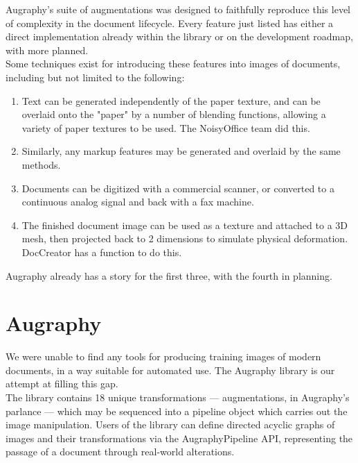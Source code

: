 \documentclass[runningheads]{llncs}
\begin{document}
Augraphy's suite of augmentations was designed to faithfully reproduce this level of complexity in the document lifecycle. Every feature just listed has either a direct implementation already within the library or on the development roadmap, with more planned.\\

Some techniques exist for introducing these features into images of documents, including but not limited to the following:
\begin{enumerate}
\item Text can be generated independently of the paper texture, and can be overlaid onto the "paper" by a number of blending functions, allowing a variety of paper textures to be used. The NoisyOffice team did this.
\item Similarly, any markup features may be generated and overlaid by the same methods.
\item Documents can be digitized with a commercial scanner, or converted to a continuous analog signal and back with a fax machine.
\item The finished document image can be used as a texture and attached to a 3D mesh, then projected back to 2 dimensions to simulate physical deformation. DocCreator has a function to do this.
\end{enumerate}

Augraphy already has a story for the first three, with the fourth in planning.

\section{Augraphy}
We were unable to find any tools for producing training images of modern documents, in a way suitable for automated use. The Augraphy library is our attempt at filling this gap.\\

The library contains 18 unique transformations — augmentations, in Augraphy's parlance — which may be sequenced into a pipeline object which carries out the image manipulation. Users of the library can define directed acyclic graphs of images and their transformations via the AugraphyPipeline API, representing the passage of a document through real-world alterations.\\
\end{document}
